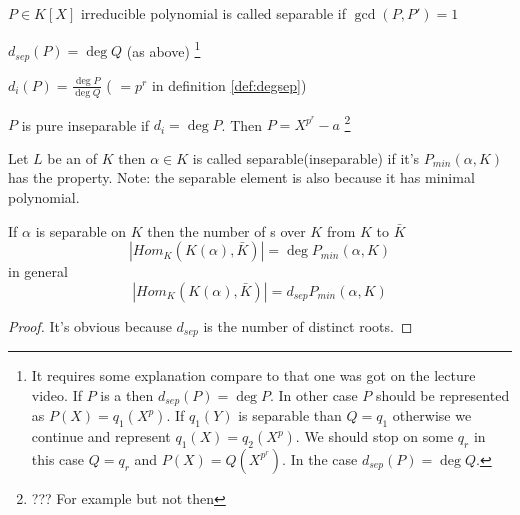 \begin{definition}
  $P\in K\left[X\right]$ irreducible polynomial is called separable if
  $\gcd\left(P, P'\right) = 1$
  \label{def:separablepolynomial}
\end{definition}

\begin{definition}
  $d_{sep}(P) = \deg Q$ (as above)
  \footnote{    
    It requires some explanation compare to that one was got on the
    lecture video.
    If $P$ is a  then
    $d_{sep}(P) = \deg P$. In other case $P$ should be represented as
    $P\left(X\right) = q_1(X^p)$. If $q_1\left(Y\right)$ is separable
    than $Q = q_1$ otherwise we continue and represent
    $q_1\left(X\right) = q_2\left(X^p\right)$. We should stop on some
    $q_r$ in this case $Q = q_r$ and $P\left(X\right) =
    Q\left(X^{p^r}\right)$. In the case $d_{sep}(P) = \deg Q$.
  }
  \label{def:degsep}
\end{definition}

\begin{definition}
  $d_{i}(P) = \frac{\deg P}{\deg Q}$ ( $=p^r$ in definition
  \ref{def:degsep}) 
  \label{def:deginsep}
\end{definition}

\begin{definition}
  $P$ is pure inseparable if $d_i = \deg P$.
  Then $P = X^{p^r} - a$
  \footnote{
    ??? For example but not then
  }
  \label{def:deginseppol}
\end{definition}

\begin{definition}
  Let $L$ be an  of $K$ then $\alpha \in K$ is
  called separable(inseparable) if it's
   $P_{min}\left(\alpha, K\right)$ has
  the property.
  Note: the separable element is also 
  because it has minimal polynomial.
  \label{def:degsepelem}
\end{definition}

\begin{proposition}
  If $\alpha$ is separable on $K$ then the number of
  s over $K$ from $K$ to $\bar{K}$
  \[
  \left|Hom_K\left(K\left(\alpha\right), \bar{K}\right)\right| =
  \deg P_{min}\left(\alpha, K\right)
  \]
  in general
  \[
  \left|Hom_K\left(K\left(\alpha\right), \bar{K}\right)\right| =
  d_{sep} P_{min}\left(\alpha, K\right)
  \]  
  \begin{proof}
    It's obvious because $d_{sep}$ is the number of distinct roots.
  \end{proof}
  \label{prop:lec3_2}
\end{proposition}


